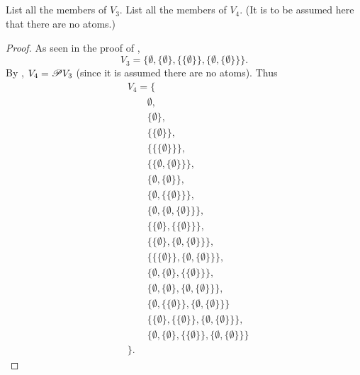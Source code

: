\documentclass{report}
\begin{document}
\subsection{}%

  List all the members of $V_3$.
  List all the members of $V_4$.
  (It is to be assumed here that there are no atoms.)

  \begin{proof}

    As seen in the proof of ,
      $$V_3 = \{
          \emptyset,
          \{\emptyset\},
          \{\{\emptyset\}\},
          \{\emptyset, \{\emptyset\}\}
      \}.$$
    By , $V_4 = \mathscr{P}V_3$ (since it is assumed
      there are no atoms).
    Thus
      \begin{align*}
        & V_4 = \{ \\
        & \qquad \emptyset, \\
        & \qquad \{\emptyset\}, \\
        & \qquad \{\{\emptyset\}\}, \\
        & \qquad \{\{\{\emptyset\}\}\}, \\
        & \qquad \{\{\emptyset, \{\emptyset\}\}\}, \\
        & \qquad \{\emptyset, \{\emptyset\}\}, \\
        & \qquad \{\emptyset, \{\{\emptyset\}\}\}, \\
        & \qquad \{\emptyset, \{\emptyset, \{\emptyset\}\}\}, \\
        & \qquad \{\{\emptyset\}, \{\{\emptyset\}\}\}, \\
        & \qquad \{\{\emptyset\}, \{\emptyset, \{\emptyset\}\}\}, \\
        & \qquad \{\{\{\emptyset\}\}, \{\emptyset, \{\emptyset\}\}\}, \\
        & \qquad \{\emptyset, \{\emptyset\}, \{\{\emptyset\}\}\}, \\
        & \qquad \{\emptyset, \{\emptyset\}, \{\emptyset, \{\emptyset\}\}\}, \\
        & \qquad \{\emptyset, \{\{\emptyset\}\}, \{\emptyset, \{\emptyset\}\}\} \\
        & \qquad \{\{\emptyset\}, \{\{\emptyset\}\}, \{\emptyset, \{\emptyset\}\}\}, \\
        & \qquad \{\emptyset, \{\emptyset\}, \{\{\emptyset\}\}, \{\emptyset, \{\emptyset\}\}\} \\
        & \}.
      \end{align*}
  \end{proof}
\end{document}
